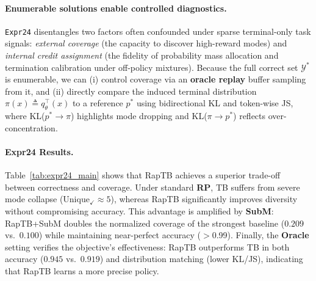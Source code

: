 \documentclass{article}
\theoremstyle{plain}
\theoremstyle{definition}
\theoremstyle{remark}
\begin{document}
\paragraph{Enumerable solutions enable controlled diagnostics.}
\texttt{Expr24} disentangles two factors often confounded under sparse terminal-only task signals: \emph{external coverage} (the capacity to discover high-reward modes) and \emph{internal credit assignment} (the fidelity of probability mass allocation and termination calibration under off-policy mixtures).
Because the full correct set $\mathcal{Y}^*$ is enumerable, we can (i) control coverage via an \textbf{oracle replay} buffer sampling from it,
and (ii) directly compare the induced terminal distribution $\pi(x)\triangleq q_\theta^{\top}(x)$ to a reference $p^*$ using bidirectional KL and token-wise JS,
where KL($p^*\!\to\!\pi$) highlights mode dropping and KL($\pi\!\to\!p^*$) reflects over-concentration.

\paragraph{Expr24 Results.}
Table~\ref{tab:expr24_main} shows that RapTB achieves a superior trade-off between correctness and coverage.
Under standard \textbf{RP}, TB suffers from severe mode collapse (Unique$_\checkmark\!\approx\!5$), whereas RapTB significantly improves diversity without compromising accuracy.
This advantage is amplified by \textbf{SubM}: RapTB+SubM doubles the normalized coverage of the strongest baseline ($0.209$ vs.\ $0.100$) while maintaining near-perfect accuracy ($>$0.99).
Finally, the \textbf{Oracle} setting verifies the objective's effectiveness: RapTB outperforms TB in both accuracy ($0.945$ vs.\ $0.919$) and distribution matching (lower KL/JS), indicating that RapTB learns a more precise policy.
\end{document}
